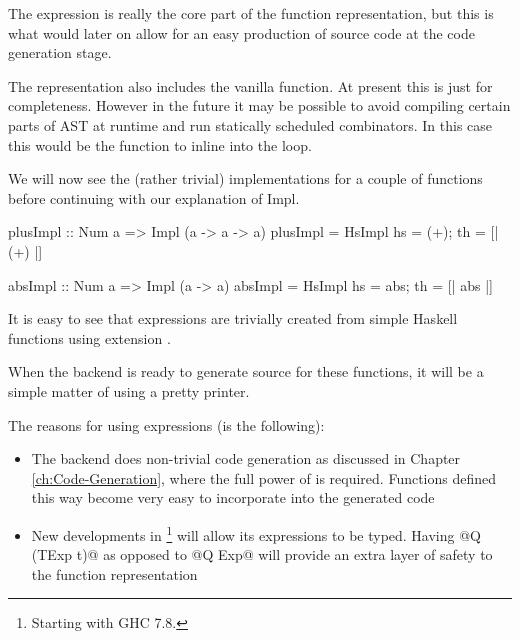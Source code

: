 \documentclass[preamble.tex]{subfiles}
\begin{document}
The  expression is really the core part of the function representation, but this is what would later on allow for an easy production of \Haskell source code at the code generation stage.

The representation also includes the vanilla \Haskell function. At present this is just for completeness. However in the future it may be possible to avoid compiling certain parts of AST at runtime and run statically scheduled combinators. In this case this would be the function to inline into the loop.

We will now see the (rather trivial) implementations for a couple of functions before continuing with our explanation of Impl.

\begin{hscode}
plusImpl :: Num a => Impl (a -> a -> a)
plusImpl = HsImpl { hs = (+); th = [| (+) |] } 

absImpl :: Num a => Impl (a -> a)
absImpl = HsImpl { hs = abs; th = [| abs |] } 
\end{hscode}

It is easy to see that  expressions are trivially created from simple Haskell functions using  extension \cite{QQ}.

When the backend is ready to generate \Haskell source for these functions, it will be a simple matter of using a  pretty printer. 

The reasons for using  expressions (is the following):
\begin{itemize}
\item The backend does non-trivial code generation as discussed in Chapter \ref{ch:Code-Generation}, where the full power of  is required. Functions defined this way become very easy to incorporate into the generated code
\item New developments in \footnote{Starting with GHC 7.8.} will allow its expressions to be typed. Having @Q (TExp t)@ as opposed to @Q Exp@ will provide an extra layer of safety to the function representation
\end{itemize}



\end{document}
